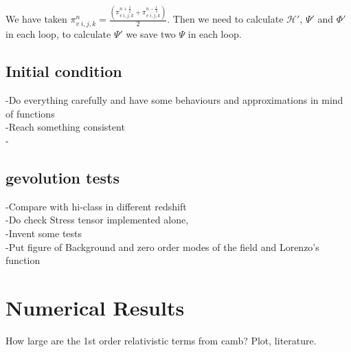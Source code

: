 \documentclass[a4paper,11pt]{article}
\begin{document}
 We have taken $\pi_{v  \; {i,j,k}}^{n} =\frac{(\pi_{v  \; {i,j,k}}^{n+\frac{1}{2}} +\pi_{v \; {i,j,k}}^{n-\frac{1}{2}} )}{2} $. Then we need to calculate $\mathcal{H}'$, ${\Psi}'$ and  ${\Phi}'$ in each loop, to calculate ${\Psi}'$ we save two $\Psi$ in each loop. \\

\subsection{Initial condition}
-Do everything carefully and have some behaviours and approximations in mind of functions \\
-Reach something consistent\\
-
\subsection{gevolution tests}
-Compare with hi-class in different redshift\\
-Do check Stress tensor implemented alone,\\
-Invent some tests \\
-Put figure of Background and zero order modes of the field and Lorenzo's function
\section{Numerical Results}
\label{s:num}
How large are the 1st order relativistic terms from camb? Plot, literature.
\end{document}
